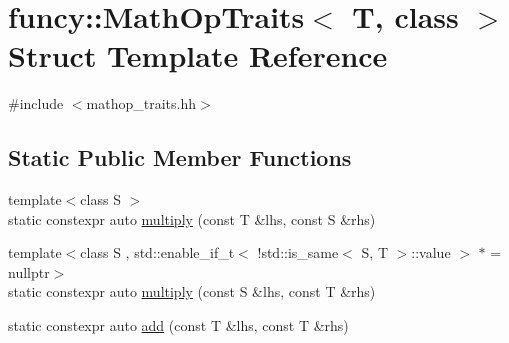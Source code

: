 \hypertarget{structfuncy_1_1MathOpTraits}{\section{funcy\-:\-:Math\-Op\-Traits$<$ T, class $>$ Struct Template Reference}
\label{structfuncy_1_1MathOpTraits}
}


{\ttfamily \#include $<$mathop\-\_\-traits.\-hh$>$}

\subsection*{Static Public Member Functions}
\begin{DoxyCompactItemize}
\item 
{\footnotesize template$<$class S $>$ }\\static constexpr auto \hyperlink{structfuncy_1_1MathOpTraits_aa2fdabd95ab61f9f273eee2802b210a1}{multiply} (const T \&lhs, const S \&rhs)
\item 
{\footnotesize template$<$class S , std\-::enable\-\_\-if\-\_\-t$<$ !std\-::is\-\_\-same$<$ S, T $>$\-::value $>$ $\ast$  = nullptr$>$ }\\static constexpr auto \hyperlink{structfuncy_1_1MathOpTraits_a9da4c2e1409b9bf20b39ebcff04ddb0f}{multiply} (const S \&lhs, const T \&rhs)
\item 
static constexpr auto \hyperlink{structfuncy_1_1MathOpTraits_a5a5ac703e16c211239b7a11bb3466267}{add} (const T \&lhs, const T \&rhs)
\end{DoxyCompactItemize}


